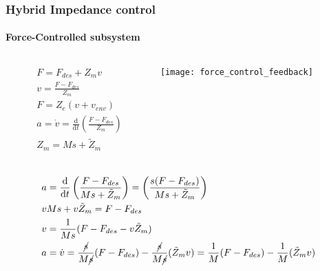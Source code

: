 \begin{frame}[shrink=10]
  \frametitle{Hybrid Impedance control}
  \framesubtitle{Force-Controlled subsystem}
  \begin{columns}
    \begin{column}{0.4\textwidth}
      \begin{align*}
        &F = F_{des} + Z_m v\\
        &v = \frac{F - F_{des}}{Z_m}\\
        &F = Z_e(v + v_{env})\\
        &a = \dot{v} = \frac{\mathrm{d}}{\mathrm{d}t} \left(\frac{F - F_{des}}{Z_m} \right)\\
        &Z_m = M s + \tilde{Z}_m\\
      \end{align*}
    \end{column}
    \begin{column}{0.5\textwidth}
      \centering
      \texttt{[image: force\_control\_feedback]}            
    \end{column}
  \end{columns}

  \begin{align*}
    &a = \frac{\mathrm{d}}{\mathrm{d}t} \left(\frac{F - F_{des}}{Ms + \tilde{Z}_m} \right) = \left(\frac{s(F - F_{des})}{Ms + \tilde{Z}_m} \right)\\
   &vMs + v \tilde{Z}_m = F - F_{des}\\
   &v = \frac{1}{Ms} (F - F_{des} - v \tilde{Z}_m )\\
   &a = \dot{v} = \frac{\cancel{s}}{M\cancel{s}} (F - F_{des}) - \frac{\cancel{s}}{M\cancel{s}}( \tilde{Z}_m v) = \frac{1}{M} (F - F_{des}) - \frac{1}{M}( \tilde{Z}_m v) \\
  \end{align*}
\end{frame}


